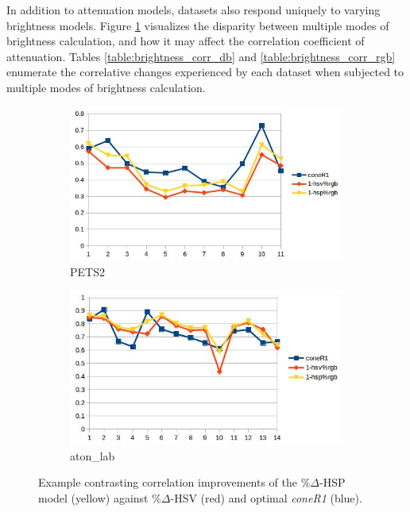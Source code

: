\documentclass[12pt]{report}
\begin{document}
In addition to attenuation models, datasets also respond uniquely to varying brightness models. Figure \ref{fig:brightness_example} visualizes the disparity between multiple modes of brightness calculation, and how it may affect the correlation coefficient of attenuation. Tables \ref{table:brightness_corr_db} and \ref{table:brightness_corr_rgb} enumerate the correlative changes experienced by each dataset when subjected to multiple modes of brightness calculation.

\begin{figure}
\centering
\begin{subfigure}{.49\linewidth}
  \includegraphics[width=1\linewidth]{figures/brightness/rgb/pets2_hsv_hsp.jpg}
  \caption{PETS2}
\end{subfigure}
\hfill
\begin{subfigure}{.49\linewidth}
  \includegraphics[width=1\linewidth]{figures/brightness/rgb/lab_hsv_hsp.jpg}
  \caption{aton\_lab}
\end{subfigure}

\caption{Example contrasting correlation improvements of the \%$\Delta$-HSP model (yellow) against \%$\Delta$-HSV (red) and optimal \textit{coneR1} (blue). }
\label{fig:brightness_example}
\end{figure}
\end{document}
